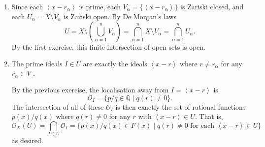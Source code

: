 \documentclass[12 pt, letterpaper]{hmcpset}
\begin{document}
\begin{solution}
	\begin{enumerate}
		\item Since each $\left < x - r_{\alpha} \right >$ is prime, each $V_{\alpha} = \{ \left < x - r_{\alpha} \right > \}$ is Zariski closed, and each $U_{\alpha} = X \setminus V_{\alpha}$ is Zariski open. By De Morgan's laws
			\[
				U = X \setminus \left ( \bigcup_{\alpha = 1}^{n} V_{\alpha} \right ) = \bigcap_{\alpha = 1}^{n} X \setminus V_{\alpha} = \bigcap_{\alpha = 1}^{n} U_{\alpha}.
			\]
			By the first exercise, this finite intersection of open sets is open.
		\item The prime ideals $I \in U$ are exactly the ideals $\left < x - r \right >$ where $r \neq r_{\alpha}$ for any $r_{\alpha} \in V$	. 

			By the previous exercise, the localisation away from $I = \left < x - r \right >$ is
			\[
				\mathcal{O}_{I} = \{ p / q \in \mathbb{Q} \mid q(r) \neq 0 \}.
			\]
			The intersection of all of these $\mathcal{O}_{I}$ is then exactly the set of rational functions $p(x) / q(x)$ where $q(r) \neq 0$ for any $r$ with $\left < x - r \right > \in U$. That is,
			\[
				\mathcal{O}_{X}(U) = \bigcap_{I \in U} \mathcal{O}_{I} = \{ p(x) / q(x) \in F(x) \mid q(r) \neq 0 \text{ for each } \left < x - r \right > \in U \}
			\]
			as desired.
	\end{enumerate}
\end{solution}
\end{document}
